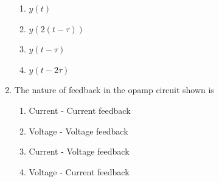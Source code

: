 \documentclass[article]{IEEEtran}
\numberwithin{figure}{enumi}
\begin{document}
\begin{enumerate}
\begin{enumerate}
\item $y(t)$
\item $y(2(t - \tau))$
\item $y(t - \tau)$
\item $y(t - 2\tau)$
\end{enumerate}

\item The nature of feedback in the opamp circuit shown is

\begin{enumerate}
\item Current - Current feedback
\item Voltage - Voltage feedback
\item Current - Voltage feedback
\item Voltage - Current feedback
\end{enumerate}

\end{enumerate}
\end{document}
